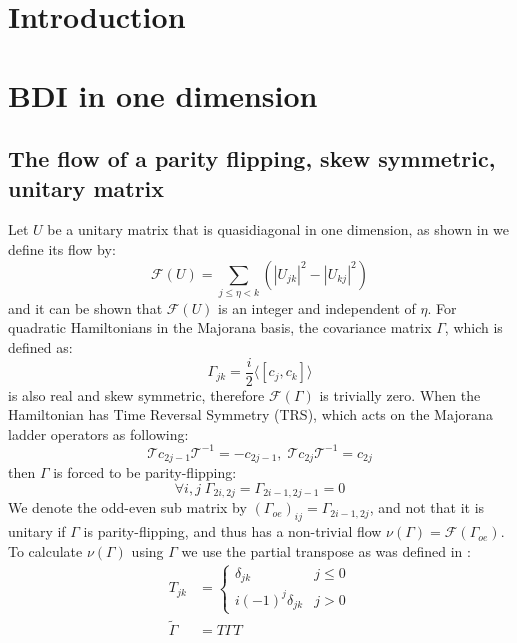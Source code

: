 \documentclass[%
 reprint,
 amsmath,amssymb,
 aps,
]{revtex4-2}
\begin{document}

\section{Introduction}


\section{BDI in one dimension}

\subsection{The flow of a parity flipping, skew symmetric, unitary matrix}
Let $U$ be a unitary matrix that is quasidiagonal in one dimension, as shown in \cite{kitaev2006} we define its flow by:
\begin{equation}
    \mathcal{F}(U)=\sum_{j\le\eta<k}\left(|U_{jk}|^2-|U_{kj}|^2\right)
\end{equation}
and it can be shown that $\mathcal{F}(U)$ is an integer and independent of $\eta$. For quadratic Hamiltonians in the Majorana basis, the covariance matrix $\Gamma$, which is defined as:
\begin{equation}
    \Gamma_{jk}=\frac{i}{2}\langle[c_j,c_k]\rangle
\end{equation}
is also real and skew symmetric, therefore $\mathcal{F}(\Gamma)$ is trivially zero.
When the Hamiltonian has Time Reversal Symmetry (TRS), which acts on the Majorana ladder operators as following:
\begin{equation}
    \mathcal{T}c_{2j-1}\mathcal{T}^{-1}=-c_{2j-1}, \; \mathcal{T}c_{2j}\mathcal{T}^{-1}=c_{2j}
\end{equation}
then $\Gamma$ is forced to be parity-flipping:
\begin{equation}
    \forall i,j \; \Gamma_{2i,2j}=\Gamma_{2i-1,2j-1}=0
\end{equation}
We denote the odd-even sub matrix by $(\Gamma_{oe})_{ij}=\Gamma_{2i-1,2j}$, and not that it is unitary if $\Gamma$ is parity-flipping, and thus has a non-trivial flow $\nu(\Gamma)=\mathcal{F}(\Gamma_{oe})$. 
To calculate $\nu(\Gamma)$ using $\Gamma$ we use the partial transpose as was defined in \cite{shap2017}:
\begin{equation}
    \begin{split}
    T_{jk} &= \left\{ \begin{matrix} \delta_{jk} & j \le 0 \\ i(-1)^j\delta_{jk} & j>0 \end{matrix}\right. \\
    \tilde\Gamma &= T\Gamma T
    \end{split}
\end{equation}
\end{document}
